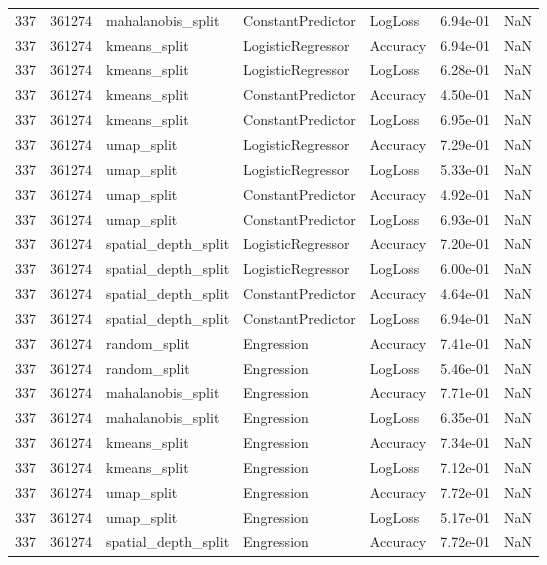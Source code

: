 \begin{tabular}{rrlllrr}
337 & 361274 & mahalanobis\_split & ConstantPredictor & LogLoss & 6.94e-01 & NaN \\
337 & 361274 & kmeans\_split & LogisticRegressor & Accuracy & 6.94e-01 & NaN \\
337 & 361274 & kmeans\_split & LogisticRegressor & LogLoss & 6.28e-01 & NaN \\
337 & 361274 & kmeans\_split & ConstantPredictor & Accuracy & 4.50e-01 & NaN \\
337 & 361274 & kmeans\_split & ConstantPredictor & LogLoss & 6.95e-01 & NaN \\
337 & 361274 & umap\_split & LogisticRegressor & Accuracy & 7.29e-01 & NaN \\
337 & 361274 & umap\_split & LogisticRegressor & LogLoss & 5.33e-01 & NaN \\
337 & 361274 & umap\_split & ConstantPredictor & Accuracy & 4.92e-01 & NaN \\
337 & 361274 & umap\_split & ConstantPredictor & LogLoss & 6.93e-01 & NaN \\
337 & 361274 & spatial\_depth\_split & LogisticRegressor & Accuracy & 7.20e-01 & NaN \\
337 & 361274 & spatial\_depth\_split & LogisticRegressor & LogLoss & 6.00e-01 & NaN \\
337 & 361274 & spatial\_depth\_split & ConstantPredictor & Accuracy & 4.64e-01 & NaN \\
337 & 361274 & spatial\_depth\_split & ConstantPredictor & LogLoss & 6.94e-01 & NaN \\
337 & 361274 & random\_split & Engression & Accuracy & 7.41e-01 & NaN \\
337 & 361274 & random\_split & Engression & LogLoss & 5.46e-01 & NaN \\
337 & 361274 & mahalanobis\_split & Engression & Accuracy & 7.71e-01 & NaN \\
337 & 361274 & mahalanobis\_split & Engression & LogLoss & 6.35e-01 & NaN \\
337 & 361274 & kmeans\_split & Engression & Accuracy & 7.34e-01 & NaN \\
337 & 361274 & kmeans\_split & Engression & LogLoss & 7.12e-01 & NaN \\
337 & 361274 & umap\_split & Engression & Accuracy & 7.72e-01 & NaN \\
337 & 361274 & umap\_split & Engression & LogLoss & 5.17e-01 & NaN \\
337 & 361274 & spatial\_depth\_split & Engression & Accuracy & 7.72e-01 & NaN \\

\end{tabular}
